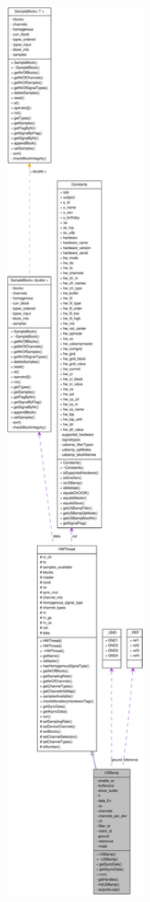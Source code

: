 \begin{figure}[H]
\begin{center}
\leavevmode
\includegraphics[width=400pt]{class_u_s_bamp__coll__graph}
\end{center}
\end{figure}

